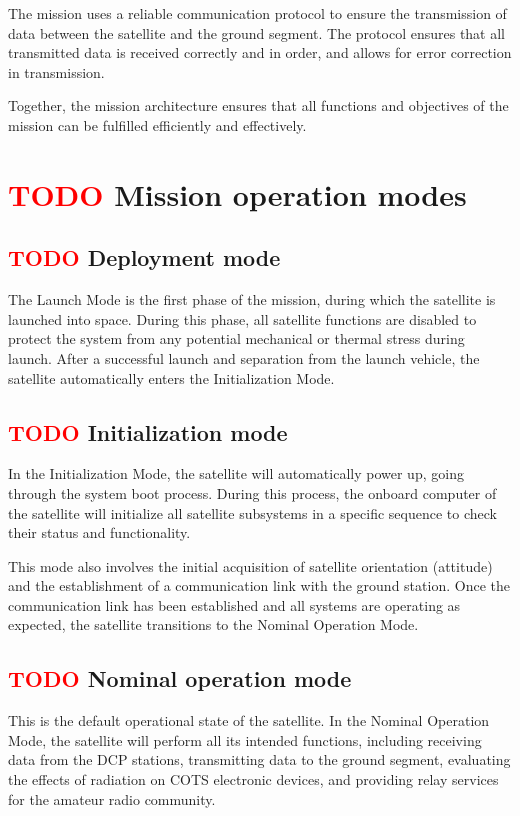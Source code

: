 The mission uses a reliable communication protocol to ensure the transmission of data between the satellite and the ground segment. The protocol ensures that all transmitted data is received correctly and in order, and allows for error correction in transmission.

Together, the mission architecture ensures that all functions and objectives of the mission can be fulfilled efficiently and effectively.

\section{ \textcolor{red}{TODO} Mission operation modes}

\subsection{ \textcolor{red}{TODO} Deployment mode}

The Launch Mode is the first phase of the mission, during which the satellite is launched into space. During this phase, all satellite functions are disabled to protect the system from any potential mechanical or thermal stress during launch. After a successful launch and separation from the launch vehicle, the satellite automatically enters the Initialization Mode.

\subsection{ \textcolor{red}{TODO} Initialization mode}

In the Initialization Mode, the satellite will automatically power up, going through the system boot process. During this process, the onboard computer of the satellite will initialize all satellite subsystems in a specific sequence to check their status and functionality.

This mode also involves the initial acquisition of satellite orientation (attitude) and the establishment of a communication link with the ground station. Once the communication link has been established and all systems are operating as expected, the satellite transitions to the Nominal Operation Mode.

\subsection{ \textcolor{red}{TODO} Nominal operation mode}

This is the default operational state of the satellite. In the Nominal Operation Mode, the satellite will perform all its intended functions, including receiving data from the DCP stations, transmitting data to the ground segment, evaluating the effects of radiation on COTS electronic devices, and providing relay services for the amateur radio community.

